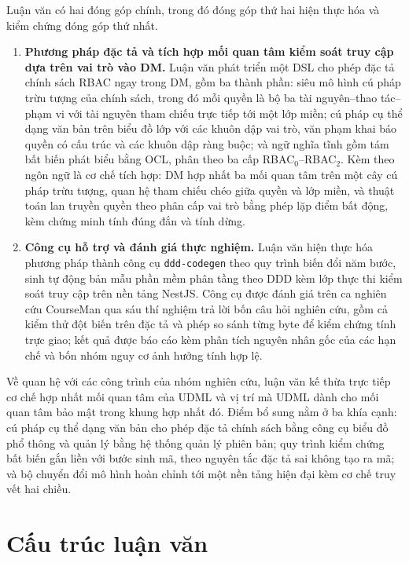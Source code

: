 Luận văn có hai đóng góp chính, trong đó đóng góp thứ hai hiện thực hóa và kiểm chứng đóng góp thứ nhất.

\begin{enumerate}[label=\roman*.,leftmargin=2em,itemsep=4pt]
  \item \textbf{Phương pháp đặc tả và tích hợp mối quan tâm kiểm soát truy cập dựa trên vai trò vào DM.} Luận văn phát triển một DSL cho phép đặc tả chính sách RBAC ngay trong DM, gồm ba thành phần: siêu mô hình cú pháp trừu tượng của chính sách, trong đó mỗi quyền là bộ ba tài nguyên--thao tác--phạm vi với tài nguyên tham chiếu trực tiếp tới một lớp miền; cú pháp cụ thể dạng văn bản trên biểu đồ lớp với các khuôn dập vai trò, văn phạm khai báo quyền có cấu trúc và các khuôn dập ràng buộc; và ngữ nghĩa tĩnh gồm tám bất biến phát biểu bằng OCL, phân theo ba cấp RBAC$_0$--RBAC$_2$. Kèm theo ngôn ngữ là cơ chế tích hợp: DM hợp nhất ba mối quan tâm trên một cây cú pháp trừu tượng, quan hệ tham chiếu chéo giữa quyền và lớp miền, và thuật toán lan truyền quyền theo phân cấp vai trò bằng phép lặp điểm bất động, kèm chứng minh tính đúng đắn và tính dừng.

  \item \textbf{Công cụ hỗ trợ và đánh giá thực nghiệm.} Luận văn hiện thực hóa phương pháp thành công cụ \texttt{ddd-codegen} theo quy trình biến đổi năm bước, sinh tự động bản mẫu phần mềm phân tầng theo DDD kèm lớp thực thi kiểm soát truy cập trên nền tảng NestJS. Công cụ được đánh giá trên ca nghiên cứu CourseMan qua sáu thí nghiệm trả lời bốn câu hỏi nghiên cứu, gồm cả kiểm thử đột biến trên đặc tả và phép so sánh từng byte để kiểm chứng tính trực giao; kết quả được báo cáo kèm phân tích nguyên nhân gốc của các hạn chế và bốn nhóm nguy cơ ảnh hưởng tính hợp lệ.
\end{enumerate}

Về quan hệ với các công trình của nhóm nghiên cứu, luận văn kế thừa trực tiếp cơ chế hợp nhất mối quan tâm của UDML \cite{le2025udml} và vị trí mà UDML dành cho mối quan tâm bảo mật trong khung hợp nhất đó. Điểm bổ sung nằm ở ba khía cạnh: cú pháp cụ thể dạng văn bản cho phép đặc tả chính sách bằng công cụ biểu đồ phổ thông và quản lý bằng hệ thống quản lý phiên bản; quy trình kiểm chứng bất biến gắn liền với bước sinh mã, theo nguyên tắc đặc tả sai không tạo ra mã; và bộ chuyển đổi mô hình hoàn chỉnh tới một nền tảng hiện đại kèm cơ chế truy vết hai chiều.

\section{Cấu trúc luận văn}
\label{sec:cau-truc}

